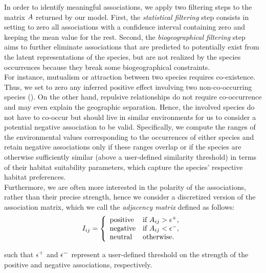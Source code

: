 \documentclass[10pt,a4paper]{article}
\begin{document}
In order to identify meaningful associations, we apply two filtering steps to the matrix $A$ returned by our model. First, the \emph{statistical filtering} step consists in setting to zero all associations with a confidence interval containing zero and keeping the mean value for the rest. Second, the \emph{biogeographical filtering} step aims to further eliminate associations that are predicted to potentially exist from the latent representations of the species, but are not realized by the species occurrences because they break some biogeographical constraints. \\

For instance, mutualism or attraction between two species requires co-existence. Thus, we set to zero any inferred positive effect involving two non-co-occurring species (\cite{sanderson2015patterns}). On the other hand, repulsive relationships do not require co-occurrence and may even explain the geographic separation. Hence, the involved species do not have to co-occur but should live in similar environments for us to consider a potential negative association to be valid. Specifically, we compute the ranges of the environmental values corresponding to the occurrences of either species and retain negative associations only if these ranges overlap or if the species are otherwise sufficiently similar (above a user-defined similarity threshold) in terms of their habitat suitability parameters, which capture the species' respective habitat preferences. \\

Furthermore, we are often more interested in the polarity of the associations, rather than their precise strength, hence we consider a discretized version of the association matrix, which we call the \emph{adjacency matrix} defined as follows:
\begin{equation*}
I_{ij} =  \left\{
\begin{array}{ll}
\text{positive} & \mbox{if } A_{ij}>\epsilon^+, \\
\text{negative} & \mbox{if } A_{ij}<\epsilon^-, \\
\text{neutral} & \mbox{otherwise.}
\end{array}
\right.
\end{equation*}

such that $\epsilon^+$ and $\epsilon^-$ represent a user-defined threshold on the strength of the positive and negative associations, respectively. \\
\end{document}
